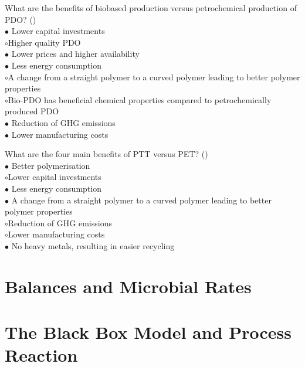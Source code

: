 \documentclass[]{beamer}
\begin{document}
\begin{CJK}{UTF8}{gbsn}
\begin{frame}[shrink] {} 
\addtocounter{questions}{1}
\color{blue}
  What are the benefits of biobased production versus petrochemical production of PDO?
 ({})\\
\color{black}
\setlength{\parindent}{-0.4cm}
{\color{red}$\bullet$} Lower capital investments  \\
{\color{red}$\circ$}Higher quality PDO   \\
{\color{red}$\bullet$} Lower prices and higher availability  \\
{\color{red}$\bullet$} Less energy consumption  \\
{\color{red}$\circ$}A change from a straight polymer to a curved polymer leading to better polymer properties  \\
{\color{red}$\circ$}Bio-PDO has beneficial chemical properties compared to petrochemically produced PDO  \\
{\color{red}$\bullet$} Reduction of GHG emissions  \\
{\color{red}$\bullet$} Lower manufacturing costs  \\
\end{frame}


\begin{frame}[shrink] {} 
\addtocounter{questions}{1}
\color{blue}
  What are the four main benefits of PTT versus PET?
 ({})\\
\color{black}
\setlength{\parindent}{-0.4cm}
{\color{red}$\bullet$} Better polymerisation   \\
{\color{red}$\circ$}Lower capital investments  \\
{\color{red}$\bullet$} Less energy consumption  \\
{\color{red}$\bullet$} A change from a straight polymer to a curved polymer leading to better polymer properties  \\
{\color{red}$\circ$}Reduction of GHG emissions  \\
{\color{red}$\circ$}Lower manufacturing costs  \\
{\color{red}$\bullet$} No heavy metals, resulting in easier recycling  \\

\end{frame}
\section{Balances and Microbial Rates}
\section{The Black Box Model and Process Reaction}

\end{CJK}
\end{document}
